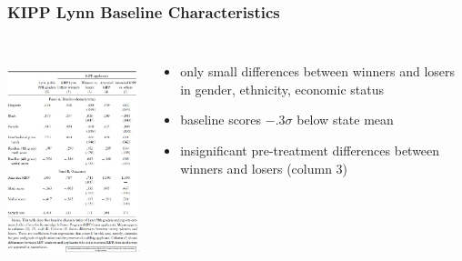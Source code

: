 \documentclass{beamer}
\begin{document}
\begin{frame}
\frametitle{KIPP Lynn Baseline Characteristics}

\begin{columns}
\includegraphics[width=6.5cm,height=6.5cm,keepaspectratio]{Table 3.1} 

\begin{itemize}
	\item only small differences between winners and losers in gender, ethnicity, economic status
	\item baseline scores $-.3\sigma$ below state mean
	\item insignificant pre-treatment differences between winners and losers (column 3)
\end{itemize}



\end{columns}
\end{frame}
\end{document}
